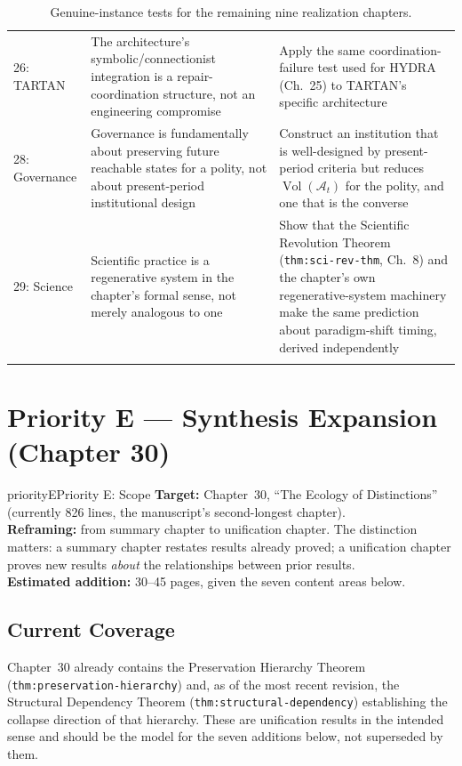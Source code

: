 \documentclass[11pt]{report}
\newcommand{\adm}{\mathcal{A}}
\newcommand{\Vol}{\operatorname{Vol}}
\begin{document}
\begin{longtable}{@{}p{3.6cm}p{6cm}p{5.3cm}@{}}
26: TARTAN & The architecture's symbolic/connectionist integration is a repair-coordination structure, not an engineering compromise & Apply the same coordination-failure test used for HYDRA (Ch.~25) to TARTAN's specific architecture \\
28: Governance & Governance is fundamentally about preserving future reachable states for a polity, not about present-period institutional design & Construct an institution that is well-designed by present-period criteria but reduces $\Vol(\adm_t)$ for the polity, and one that is the converse \\
29: Science & Scientific practice is a regenerative system in the chapter's formal sense, not merely analogous to one & Show that the Scientific Revolution Theorem (\texttt{thm:sci-rev-thm}, Ch.~8) and the chapter's own regenerative-system machinery make the same prediction about paradigm-shift timing, derived independently \\
\bottomrule
\caption{Genuine-instance tests for the remaining nine
  realization chapters.}
\label{tab:priority-d-remaining}
\end{longtable}

\chapter{Priority E --- Synthesis Expansion (Chapter 30)}
\label{ch:priority-e}

\begin{prioritybox}{priorityE}{Priority E: Scope}
\textbf{Target:} Chapter~30, ``The Ecology of Distinctions''
  (currently 826 lines, the manuscript's second-longest
  chapter).\\
\textbf{Reframing:} from summary chapter to unification
  chapter. The distinction matters: a summary chapter restates
  results already proved; a unification chapter proves new
  results \emph{about} the relationships between prior results.\\
\textbf{Estimated addition:} 30--45 pages, given the seven
  content areas below.
\end{prioritybox}

\section{Current Coverage}

Chapter~30 already contains the Preservation Hierarchy Theorem
(\texttt{thm:preservation-hierarchy}) and, as of the most recent
revision, the Structural Dependency Theorem
(\texttt{thm:structural-dependency}) establishing the collapse
direction of that hierarchy. These are unification results in
the intended sense and should be the model for the seven
additions below, not superseded by them.
\end{document}
